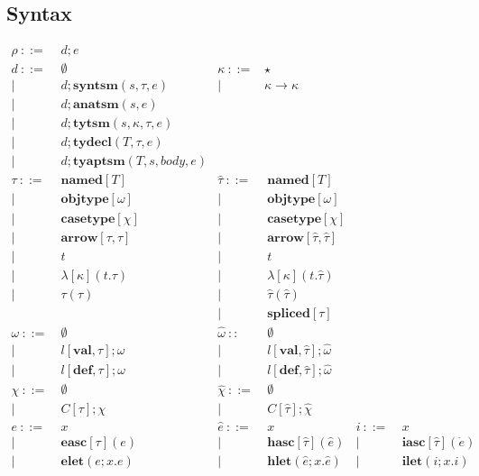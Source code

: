 \documentclass[letterpaper, notitlepage]{article}
\begin{document}
\subsection{Syntax}
\[
\begin{array}{rlrlrl}
	\rho		~::=&~ {d};e\\				
	{d}		~::=&~ \emptyset									&\kappa      ~::=& \star\\
				| ~	&~ {d}; \mathbf{syntsm}(s,\tau,e)			&| ~ & \kappa\rightarrow\kappa\\
				| ~	&~ {d}; \mathbf{anatsm}(s,e)				\\
				| ~	&~ {d};\mathbf{tytsm}(s,\kappa,\tau,e)				\\
				| ~ &~ {d};\mathbf{tydecl}(T,\tau,e)			\\
				| ~ &~ {d};\mathbf{tyaptsm}(T,s,body,e)			\\
	\tau 		~::=&~ \mathbf{named}[T]				&\hat{\tau} ~::=&~ \mathbf{named}[T]\\
				|~	& ~ \mathbf{objtype}[\omega]		&|~ &~ \mathbf{objtype}[\omega]				\\
				|~	& ~ \mathbf{casetype}[\chi]			&|~ &~ \mathbf{casetype}[\chi] 				\\
				|~ & ~ \mathbf{arrow}[\tau, \tau]		&|~ &~ \mathbf{arrow}[\hat\tau,\hat\tau] 	\\
				|~ & ~ t								&|~ &~ t 									\\
				|~ & ~ \lambda[\kappa](t.\tau)			&|~ &~ \lambda[\kappa](t.\hat{\tau})\\
				|~ & ~ \tau(\tau)						&|~ &~ \hat{\tau}(\hat{\tau})\\
				   &									&|~ &~ \mathbf{spliced}[\tau]\\
	\omega ~::=&~ 	\emptyset							&\hat{\omega} ~::&~ \emptyset\\
	 |~&  	~l[\mathbf{val}, \tau];\omega				&|~ & ~l[\mathbf{val}, \hat\tau];\hat\omega \\
	 |~&	~l[\mathbf{def}, \tau];\omega				&|~ & ~l[\mathbf{def}, \hat\tau];\hat\omega\\
	 \chi 			~::=&~	\emptyset					&\hat\chi ~::=&~	\emptyset\\
	 |~&	~C[\tau];\chi								&|~&  ~C[\hat\tau];\hat{\chi}\\
	e 			~::=&~ x 								&\hat{e}	~::=&~ 	x 										& i 		~::=&~ 	x\\
				| ~ &~ \mathbf{easc}[\tau](e)			& 		 	| ~ &~ 	\mathbf{hasc}[\hat\tau](\hat{e})		& 		 	| ~ &~	\mathbf{iasc}[\hat\tau](\dot{e})\\
				| ~ &~ \mathbf{elet}(e; x.e)     		& 		 	| ~ &~ 	\mathbf{hlet}(\hat{e}; x.\hat{e})		& 		 	| ~ &~	\mathbf{ilet}(i;x.i)\\

\end{array}\]
\end{document}
